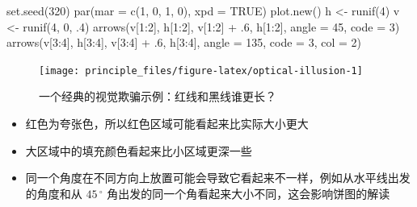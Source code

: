 \documentclass[
  b5paper,
  UTF8,twoside]{book}
\newenvironment{Shaded}{\begin{snugshade}}{\end{snugshade}}
\newcommand{\AttributeTok}[1]{\textcolor[rgb]{0.77,0.63,0.00}{#1}}
\newcommand{\ConstantTok}[1]{\textcolor[rgb]{0.00,0.00,0.00}{#1}}
\newcommand{\DecValTok}[1]{\textcolor[rgb]{0.00,0.00,0.81}{#1}}
\newcommand{\FunctionTok}[1]{\textcolor[rgb]{0.00,0.00,0.00}{#1}}
\newcommand{\NormalTok}[1]{#1}
\newcommand{\OtherTok}[1]{\textcolor[rgb]{0.56,0.35,0.01}{#1}}
\newcommand{\SpecialCharTok}[1]{\textcolor[rgb]{0.00,0.00,0.00}{#1}}
\providecommand{\tightlist}{%
  \setlength{\itemsep}{0pt}\setlength{\parskip}{0pt}}
\begin{document}
\begin{Shaded}
\begin{Highlighting}[]
\FunctionTok{set.seed}\NormalTok{(}\DecValTok{320}\NormalTok{)}
\FunctionTok{par}\NormalTok{(}\AttributeTok{mar =} \FunctionTok{c}\NormalTok{(}\DecValTok{1}\NormalTok{, }\DecValTok{0}\NormalTok{, }\DecValTok{1}\NormalTok{, }\DecValTok{0}\NormalTok{), }\AttributeTok{xpd =} \ConstantTok{TRUE}\NormalTok{)}
\FunctionTok{plot.new}\NormalTok{()}
\NormalTok{h }\OtherTok{\textless{}{-}} \FunctionTok{runif}\NormalTok{(}\DecValTok{4}\NormalTok{)}
\NormalTok{v }\OtherTok{\textless{}{-}} \FunctionTok{runif}\NormalTok{(}\DecValTok{4}\NormalTok{, }\DecValTok{0}\NormalTok{, .}\DecValTok{4}\NormalTok{)}
\FunctionTok{arrows}\NormalTok{(v[}\DecValTok{1}\SpecialCharTok{:}\DecValTok{2}\NormalTok{], h[}\DecValTok{1}\SpecialCharTok{:}\DecValTok{2}\NormalTok{], v[}\DecValTok{1}\SpecialCharTok{:}\DecValTok{2}\NormalTok{] }\SpecialCharTok{+}\NormalTok{ .}\DecValTok{6}\NormalTok{, h[}\DecValTok{1}\SpecialCharTok{:}\DecValTok{2}\NormalTok{], }\AttributeTok{angle =} \DecValTok{45}\NormalTok{, }\AttributeTok{code =} \DecValTok{3}\NormalTok{)}
\FunctionTok{arrows}\NormalTok{(v[}\DecValTok{3}\SpecialCharTok{:}\DecValTok{4}\NormalTok{], h[}\DecValTok{3}\SpecialCharTok{:}\DecValTok{4}\NormalTok{], v[}\DecValTok{3}\SpecialCharTok{:}\DecValTok{4}\NormalTok{] }\SpecialCharTok{+}\NormalTok{ .}\DecValTok{6}\NormalTok{, h[}\DecValTok{3}\SpecialCharTok{:}\DecValTok{4}\NormalTok{], }\AttributeTok{angle =} \DecValTok{135}\NormalTok{, }\AttributeTok{code =} \DecValTok{3}\NormalTok{, }\AttributeTok{col =} \DecValTok{2}\NormalTok{)}
\end{Highlighting}
\end{Shaded}

\begin{figure}

{\centering \texttt{[image: principle\_files/figure-latex/optical-illusion-1]} 

}

\caption[一个经典的视觉欺骗示例]{一个经典的视觉欺骗示例：红线和黑线谁更长？}\label{fig:optical-illusion}
\end{figure}



\begin{itemize}
\tightlist
\item
  红色为夸张色，所以红色区域可能看起来比实际大小更大
\item
  大区域中的填充颜色看起来比小区域更深一些
\item
  同一个角度在不同方向上放置可能会导致它看起来不一样，例如从水平线出发的角度和从 \(45\,^{\circ}\) 角出发的同一个角看起来大小不同，这会影响饼图的解读
\end{itemize}
\end{document}

